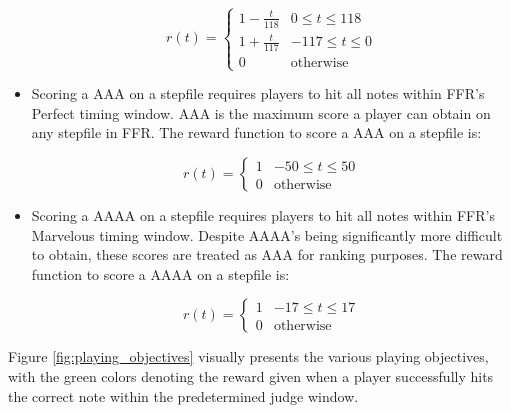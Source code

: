 \begin{itemize}
    $$r(t) = \begin{cases} 
          1- \frac{t}{118} & 0 \leq t \leq 118 \\
          1 + \frac{t}{117} & -117 \leq t \leq 0 \\
          0 & \text{otherwise}
       \end{cases}$$

    \item Scoring a AAA on a stepfile requires players to hit all notes within FFR's Perfect timing window. AAA is the maximum score a player can obtain on any stepfile in FFR. The reward function to score a AAA on a stepfile is:

    $$r(t) = \begin{cases} 
          1 & -50 \leq t \leq 50 \\
          0 & \text{otherwise}
       \end{cases}$$

    \item Scoring a AAAA on a stepfile requires players to hit all notes within FFR's Marvelous timing window. Despite AAAA's being significantly more difficult to obtain, these scores are treated as AAA for ranking purposes. The reward function to score a AAAA on a stepfile is:

    $$r(t) = \begin{cases} 
          1 & -17 \leq t \leq 17 \\
          0 & \text{otherwise}
       \end{cases}$$
\end{itemize}

Figure \ref{fig:playing_objectives} visually presents the various playing objectives, with the green colors denoting the reward given when a player successfully hits the correct note within the predetermined judge window.  

